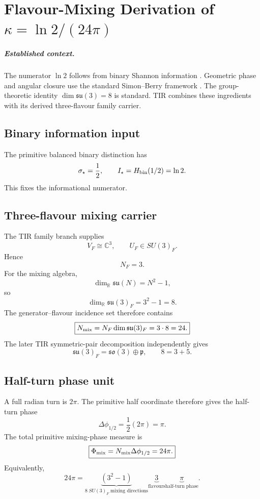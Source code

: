 \chapter{Flavour-Mixing Derivation of $\kappa=\ln2/(24\pi)$}
\label{app:kappa}

\paragraph{Established context.}
The numerator $\ln2$ follows from binary Shannon information
\cite{shannon1948,CoverThomas2006}. Geometric phase and angular closure use the
standard Simon--Berry framework \cite{Simon1983,berry1984}. The group-theoretic
identity $\dim\mathfrak{su}(3)=8$ is standard. TIR combines these ingredients
with its derived three-flavour family carrier.


\section{Binary information input}
The primitive balanced binary distinction has
\[
\sigma_\star=\frac12,
\qquad
I_\star=H_{\rm bin}(1/2)=\ln2.
\]
This fixes the informational numerator.

\section{Three-flavour mixing carrier}
The TIR family branch supplies
\[
V_F\cong\mathbb C^3,
\qquad
U_F\in SU(3)_F.
\]
Hence
\[
N_F=3.
\]
For the mixing algebra,
\[
\dim_{\mathbb R}\mathfrak{su}(N)=N^2-1,
\]
so
\[
\boxed{\dim_{\mathbb R}\mathfrak{su}(3)_F=3^2-1=8.}
\]
The generator--flavour incidence set therefore contains
\[
\boxed{
N_{\rm mix}
=N_F\dim\mathfrak{su}(3)_F
=3\cdot8
=24.
}
\]
The later TIR symmetric-pair decomposition independently gives
\[
\mathfrak{su}(3)_F=\mathfrak{so}(3)\oplus\mathfrak p,
\qquad
8=3+5.
\]

\section{Half-turn phase unit}
A full radian turn is $2\pi$. The primitive half coordinate therefore gives the
half-turn phase
\[
\boxed{
\Delta\phi_{1/2}
=\frac12(2\pi)
=\pi.
}
\]
The total primitive mixing-phase measure is
\[
\boxed{
\Phi_{\rm mix}
=N_{\rm mix}\Delta\phi_{1/2}
=24\pi.
}
\]
Equivalently,
\[
\boxed{
24\pi
=\underbrace{(3^2-1)}_{8\;SU(3)_F\;\text{mixing directions}}
\underbrace{3}_{\text{flavours}}
\underbrace{\pi}_{\text{half-turn phase}}.
}
\]

